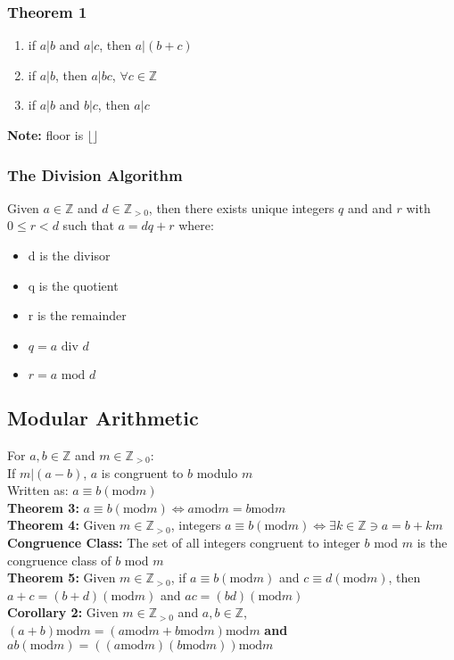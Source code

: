 \documentclass[letter]{article}
\begin{document}
\begin{multicols}{2}
  \subsubsection{Theorem 1}
  \begin{enumerate}
	  \item if $a|b$ and $a|c$, then $a|(b+c)$
	  \item if $a|b$, then $a|bc$, $\forall c \in \mathbb{Z}$
	  \item if $a|b$ and $b|c$, then $a|c$
  \end{enumerate}
  \textbf{Note:} floor is $\lfloor \rfloor$

  \subsubsection{The Division Algorithm}
  Given $a \in \mathbb{Z}$ and $d \in \mathbb{Z}_{>0}$, then there exists unique 
  integers $q$ and and $r$ with $0 \leq r < d$ such that $a = dq + r$ where:
  \begin{itemize}
	  \item d is the divisor
	  \item q is the quotient
	  \item r is the remainder
	  \item $q = a \text{ div } d$
	  \item $r = a \text{ mod } d$
  \end{itemize}
  
  \subsection{Modular Arithmetic}
  For $a, b \in \mathbb{Z}$ and $m \in \mathbb{Z}_{>0}$:\\
  If $m|(a-b)$, $a$ is congruent to $b$ modulo $m$\\
  Written as: $a \equiv b(\text{mod}m)$\\
  \textbf{Theorem 3:} $a \equiv b(\text{mod}m) \iff a \text{mod} m = b \text{mod} m$\\
  \textbf{Theorem 4:} Given $m \in \mathbb{Z}_{>0}$, integers $a \equiv b(\text{mod}m) 
  \iff \exists k \in \mathbb{Z} \ni a = b + km$\\
  \textbf{Congruence Class:} The set of all integers congruent to integer $b$ mod $m$ is 
  the congruence class of $b$ mod $m$\\
  \textbf{Theorem 5:} Given $m \in \mathbb{Z}_{>0}$, if $a \equiv b(\text{mod}m)$ and $c 
  \equiv d(\text{mod}m)$, then $a + c = (b + d)(\text{mod}m)$ and $ac = (bd)(\text{mod}m)$\\
  \textbf{Corollary 2:} Given $m \in \mathbb{Z}_{>0}$ and $a, b \in \mathbb{Z}$, $(a+b)\text{mod}m 
  = (a\text{mod}m + b\text{mod}m)\text{mod}m$ \textbf{and} $ab(\text{mod}m) = 
  ((a\text{mod}m)(b\text{mod}m))\text{mod}m$\\
  

\end{multicols}
\end{document}
